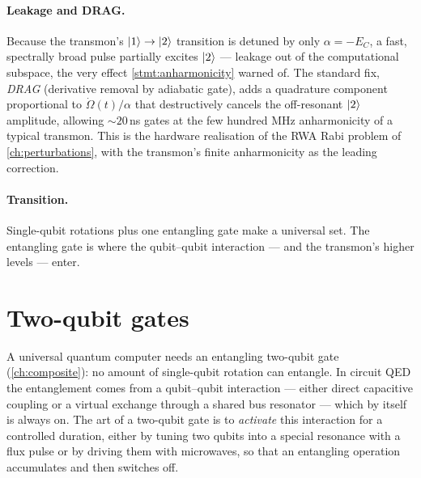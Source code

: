 \paragraph{Leakage and DRAG.}
Because the transmon's $\ket1\to\ket2$ transition is detuned by only
$\alpha=-E_C$, a fast, spectrally broad pulse partially excites
$\ket2$ --- leakage out of the computational subspace, the very effect
\cref{stmt:anharmonicity} warned of. The standard fix, \emph{DRAG}
(derivative removal by adiabatic gate), adds a quadrature component
proportional to $\dot\Omega(t)/\alpha$ that destructively cancels the
off-resonant $\ket2$ amplitude, allowing $\sim20\,$ns gates at the few
hundred MHz anharmonicity of a typical transmon. This is the hardware
realisation of the RWA Rabi problem of \cref{ch:perturbations}, with
the transmon's finite anharmonicity as the leading correction.

\paragraph{Transition.}
Single-qubit rotations plus one entangling gate make a universal set.
The entangling gate is where the qubit--qubit interaction --- and the
transmon's higher levels --- enter.

\section{Two-qubit gates}
\label{sec:two-qubit-gates}

\begin{phenomenon}
A universal quantum computer needs an entangling two-qubit gate
(\cref{ch:composite}): no amount of single-qubit rotation can entangle.
In circuit QED the entanglement comes from a qubit--qubit interaction
--- either direct capacitive coupling or a virtual exchange through a
shared bus resonator --- which by itself is always on. The art of a
two-qubit gate is to \emph{activate} this interaction for a controlled
duration, either by tuning two qubits into a special resonance with a
flux pulse or by driving them with microwaves, so that an entangling
operation accumulates and then switches off.
\end{phenomenon}

